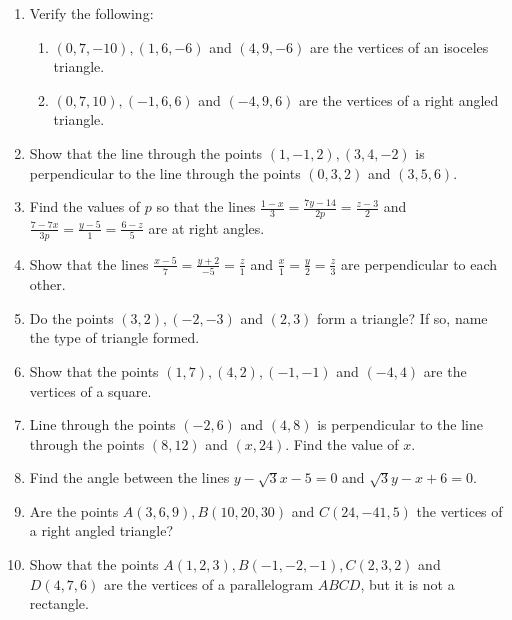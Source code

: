 \begin{enumerate}[label=\thesubsection.\arabic*, ref=\thesubsection.\theenumi]
\item Verify the following:
\begin{enumerate}
\item $(0, 7, -10),  (1, 6, -6)$ and $(4, 9, -6)$ are the vertices of an isoceles triangle.
\item $(0, 7, 10),  (-1, 6, 6)$ and $(-4, 9, 6)$ are the vertices of a right angled triangle.
\end{enumerate}
\item  Show that the line through the points $(1, -1, 2), (3, 4, -2 )$ is perpendicular to the line through the points $(0, 3, 2)$ and $(3, 5, 6)$.
\item Find the values of $p$ so that the lines $ \frac{1-x}{3}=\frac{7y-14}{2p}=\frac{z-3}{2}$ and $ \frac{7-7x}{3p}=\frac{y-5}{1}=\frac{6-z}{5}$ are at right angles.
\item Show that the lines $ \frac{x-5}{7}=\frac{y+2}{-5}=\frac{z}{1}$ and $ \frac{x}{1}=\frac{y}{2}=\frac{z}{3}$ are perpendicular to each other.
\item Do the points $(3,2), (-2,-3)$ and $(2,3)$ form a triangle? If so, name the type of triangle formed.
\item Show that the points $(1,7),(4,2),(-1,-1)$ and $(-4,4)$ are the vertices of a square.
\item Line through the points $(-2,6)$ and $(4,8)$ is perpendicular to the line through the points $(8,12)$ and $(x,24)$. Find the value of $x$.
\item Find the angle between the lines $y-\sqrt 3x-5=0$ and $\sqrt 3y-x+6=0$.
\item Are the points $A(3,6,9), B(10,20,30)$ and $C(24,-41,5)$ the vertices of a right angled triangle?
\item Show that the points $A(1,2,3), B(-1,-2,-1), C(2,3,2)$ and $D(4,7,6)$ are the vertices of a parallelogram $ABCD$, but it is not a rectangle.
\end{enumerate}
